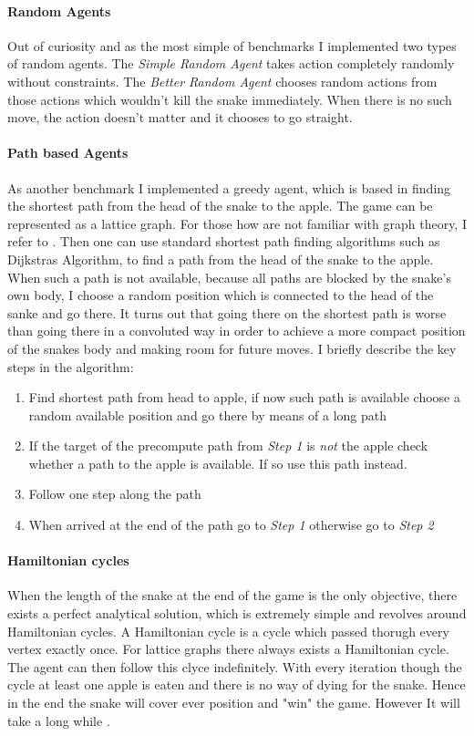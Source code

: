 \documentclass{article}
\begin{document}
\paragraph{Random Agents}
Out of curiosity and as the most simple of benchmarks I implemented two types of random agents. The \emph{Simple Random Agent} takes action completely randomly without constraints. The \emph{Better Random Agent} chooses random actions from those actions which wouldn't kill the snake immediately. When there is no such move, the action doesn't matter and it chooses to go straight.

\paragraph{Path based Agents}
As another benchmark I implemented a greedy agent, which is based in finding the shortest path from the head of the snake to the apple. The game can be represented as a lattice graph. For those how are not familiar with graph theory, I refer to  \cite{latticeGraph}. Then one can use standard shortest path finding algorithms such as Dijkstras Algorithm, to find a path from the head of the snake to the apple. When such a path is not available, because all paths are blocked by the snake's own body, I choose a random position which is connected to the head of the sanke and go there. It turns out that going there on the shortest path is worse than going there in a convoluted way in order to achieve a more compact position of the snakes body and making room for future moves. I briefly describe the key steps in the algorithm:
\begin{enumerate}
	\item Find shortest path from head to apple, if now such path is available choose a random available position and go there by means of a long path
	\item If the target of the precompute path from \emph{Step 1} is \emph{not} the apple check whether a path to the apple is available. If so use this path instead.
	\item Follow one step along the path
	\item When arrived at the end of the path go to \emph{Step 1} otherwise go to \emph{Step 2}
\end{enumerate}

\paragraph{Hamiltonian cycles}
When the length of the snake at the end of the game is the only objective, there exists a perfect analytical solution, which is extremely simple and revolves around Hamiltonian cycles. A Hamiltonian cycle is a cycle which passed thorugh every vertex exactly once. For lattice graphs there always exists a Hamiltonian cycle. The agent can then follow this clyce indefinitely. With every iteration though the cycle at least one apple is eaten and there is no way of dying for the snake. Hence in the end the snake will cover ever position and "win" the game. However It will take a long while .
\end{document}
